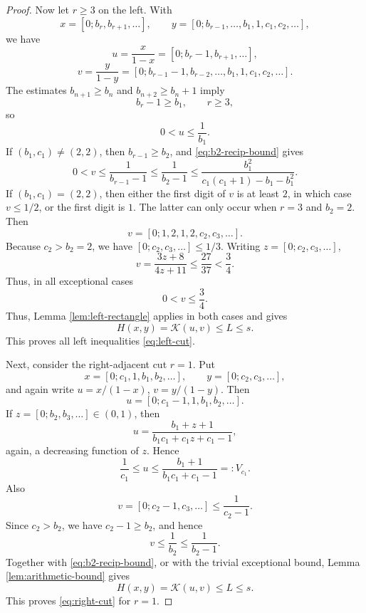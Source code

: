 \documentclass[11pt]{amsart}
\newcommand{\Kfun}{\mathcal K}
\begin{document}
\begin{proof}
Now let $r\ge3$ on the left.  With
$$
        x=[0;b_r,b_{r+1},\ldots],
        \qquad
        y=[0;b_{r-1},\ldots,b_1,1,c_1,c_2,\ldots],
$$
we have
$$
        u=\frac{x}{1-x}=[0;b_r-1,b_{r+1},\ldots],
$$
$$
        v=\frac{y}{1-y}
        =[0;b_{r-1}-1,b_{r-2},\ldots,b_1,1,c_1,c_2,\ldots].
$$
The estimates $b_{n+1}\ge b_n$ and $b_{n+2}\ge b_n+1$ imply
$$
        b_r-1\ge b_1,
        \qquad r\ge3,
$$
so
\begin{equation}\label{eq:left-nonadjacent-u}
        0<u\le \frac{1}{b_1}.
\end{equation}
If $(b_1,c_1)\ne(2,2)$, then $b_{r-1}\ge b_2$, and \eqref{eq:b2-recip-bound} gives
\begin{equation}\label{eq:left-nonadjacent-v}
        0<v\le \frac1{b_{r-1}-1}\le \frac1{b_2-1}
        \le \frac{b_1^2}{c_1(c_1+1)-b_1-b_1^2}.
\end{equation}
If $(b_1,c_1)=(2,2)$, then either the first digit of $v$ is at least $2$, in which case $v\le1/2$, or the first digit is $1$.  The latter can only occur when $r=3$ and $b_2=2$.  Then
$$
        v=[0;1,2,1,2,c_2,c_3,
        \ldots].
$$
Because $c_2>b_2=2$, we have $[0;c_2,c_3,
\ldots]\le1/3$.  Writing $z=[0;c_2,c_3,\ldots]$,
$$
        v=\frac{3z+8}{4z+11}\le \frac{27}{37}<\frac34.
$$
Thus, in all exceptional cases
\begin{equation}\label{eq:left-exceptional-v}
        0<v\le \frac34.
\end{equation}
Thus, Lemma \ref{lem:left-rectangle} applies in both cases and gives
$$
        H(x,y)=\Kfun(u,v)\le L\le s.
$$
This proves all left inequalities \eqref{eq:left-cut}.

Next, consider the right-adjacent cut $r=1$.  Put
$$
        x=[0;c_1,1,b_1,b_2,\ldots],
        \qquad
        y=[0;c_2,c_3,\ldots],
$$
and again write $u=x/(1-x)$, $v=y/(1-y)$.  Then
$$
        u=[0;c_1-1,1,b_1,b_2,\ldots].
$$
If $z=[0;b_2,b_3,\ldots]\in(0,1)$, then
$$
        u=\frac{b_1+z+1}{b_1c_1+c_1z+c_1-1},
$$
again, a decreasing function of $z$.  Hence
\begin{equation}\label{eq:right-adjacent-u}
        \frac{1}{c_1}\le u\le \frac{b_1+1}{b_1c_1+c_1-1}=:V_{c_1}.
\end{equation}
Also
$$
        v=[0;c_2-1,c_3,\ldots]
        \le \frac1{c_2-1}.
$$
Since $c_2>b_2$, we have $c_2-1\ge b_2$, and hence
\begin{equation}\label{eq:right-adjacent-v}
        v\le \frac1{b_2}\le \frac1{b_2-1}.
\end{equation}
Together with \eqref{eq:b2-recip-bound}, or with the trivial exceptional bound, Lemma
\ref{lem:arithmetic-bound} gives
$$
        H(x,y)=\Kfun(u,v)\le L\le s.
$$
This proves \eqref{eq:right-cut} for $r=1$.


\end{proof}
\end{document}
